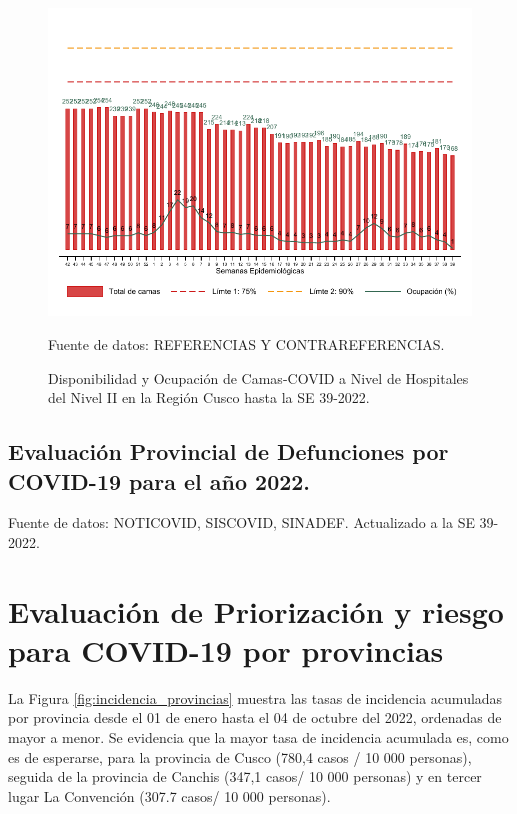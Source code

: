 \documentclass[12pt,a4paper,openany]{book}
\begin{document}
	\begin{figure}[h]
		\caption{Disponibilidad y Ocupación de Camas-COVID a Nivel de Hospitales del Nivel II en la Región Cusco hasta la SE 39-2022.}\label{fig:ocupacion_2nivel}
		\begin{center}
			\includegraphics[width=0.95\linewidth]{../figuras/nivel_2.pdf}
		\end{center}
		{\footnotesize {Fuente de datos: REFERENCIAS Y CONTRAREFERENCIAS.}}
	\end{figure}
	\clearpage
	\begin{landscape}
		
		\subsection*{Evaluación Provincial de Defunciones por COVID-19 para el año 2022.} 
		
		
		
		
		{\footnotesize Fuente de datos: NOTICOVID, SISCOVID, SINADEF. Actualizado a la SE 39-2022.}
		
		\noindent 
		
	\end{landscape}
	
	
	\clearpage
	
	\section*{Evaluación de Priorización y riesgo para COVID-19 por provincias}
	\noindent La Figura \ref{fig:incidencia_provincias} muestra las tasas de incidencia acumuladas por provincia desde el 01 de enero hasta el 04 de octubre del 2022, ordenadas de mayor a menor. Se evidencia que la mayor tasa de incidencia acumulada es, como es de esperarse, para la provincia de Cusco (780,4 casos / 10 000 personas), seguida de la provincia de Canchis (347,1 casos/ 10 000 personas) y en tercer lugar La Convención (307.7 casos/ 10 000 personas).
	
\end{document}
